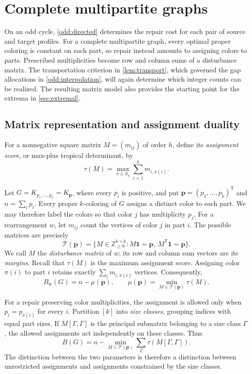 \documentclass[10pt,a4paper]{amsart}
\numberwithin{equation}{section}
\theoremstyle{definition}
\theoremstyle{remark}
\begin{document}
\section{Complete multipartite graphs}\label{sec:mp}

On an odd cycle, \cref{odd:directed} determines the repair cost for
each pair of source and target profiles. For a complete multipartite
graph, every optimal proper coloring is constant on each part, so
repair instead amounts to assigning colors to parts. Prescribed
multiplicities become row and column sums of a disturbance matrix.
The transportation criterion in \cref{lem:transport}, which governed
the gap allocations in \cref{odd:interpolation}, will again determine
which integer counts can be realized. The resulting matrix model also
provides the starting point for the extrema in \cref{sec:extremal}.

\subsection{Matrix representation and assignment duality}

For a nonnegative square matrix $M=(m_{ij})$ of order $h$, define its
\emph{assignment score}, or max-plus tropical determinant, by
\[
 \tau(M)=\max_{\pi\in S_h}\sum_{i=1}^h m_{i,\pi(i)}.
\]

Let $G=K_{p_1,\ldots,p_k}=K_{\mathbf p}$, where every $p_i$ is positive, and put
$\mathbf p=(p_1,\ldots,p_k)^{\mathsf T}$ and $n=\sum_i p_i$.
Every proper $k$-coloring of $G$ assigns a distinct color to each part.
We may therefore label the colors so that color $j$ has multiplicity
$p_j$. For a rearrangement $w$, let $m_{ij}$ count the vertices of color
$j$ in part $i$. The possible matrices are precisely
\[
 \mathcal T(\mathbf p)=\{M\in\mathbb Z_{\ge0}^{k\times k}:
 M\mathbf1=\mathbf p,\ M^{\mathsf T}\mathbf1=\mathbf p\}.
\]
We call $M$ the \emph{disturbance matrix} of $w$; its row and column
sum vectors are its \emph{margins}.
Recall that $\tau(M)$ is the maximum assignment score. Assigning color
$\pi(i)$ to part $i$ retains exactly
$\sum_i m_{i,\pi(i)}$ vertices. Consequently,
\begin{equation}\label{eq:mp:matrix-weak}
 B_{\mathrm w}(G)=n-\mu(\mathbf p),\qquad
 \mu(\mathbf p)=\min_{M\in\mathcal T(\mathbf p)}\tau(M).
\end{equation}

For a repair preserving color multiplicities, the assignment is allowed
only when $p_i=p_{\pi(i)}$ for every $i$. Partition $[k]$ into
\emph{size classes}, grouping indices with equal part sizes. If
$M[\Gamma,\Gamma]$ is the principal submatrix belonging to a size class
$\Gamma$, the allowed assignments act independently on these classes.
Thus
\begin{equation}\label{eq:mp:matrix-ordinary}
 B(G)=n-\min_{M\in\mathcal T(\mathbf p)}
       \sum_{\Gamma}\tau(M[\Gamma,\Gamma]).
\end{equation}
The distinction between the two parameters is therefore a distinction
between unrestricted assignments and assignments constrained by the
size classes.
\end{document}
